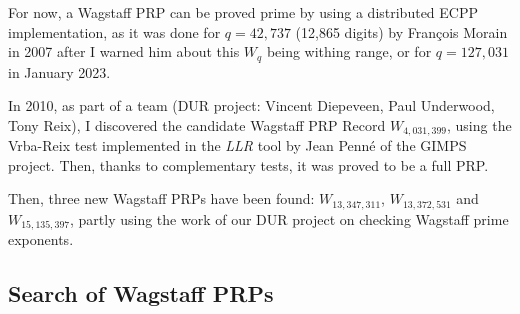 \documentclass[latin1]{quadrature}
\newif\ifenfrancais
\begin{document}
\begin{article}
\begin{article}
\vspace{.1in}

\ifenfrancais
Actuellement, il est possible de prouver qu'un nombre de Wagstaff est premier en utilisant la m\'ethode ECPP distribu\'ee sur plusieurs ordinateurs. Par exemple, c'est ainsi que le nombre de Wagstaff $W_{42,737}$ (12,865 digits) a \'et\'e prouv\'e premier par Fran\c{c}ois Morain en 2007, apr\`es que je lui ai signal\'e que ce $W_q$ \'etait \`a port\'ee des outils informatiques de l'\'epoque. Le plus r\'ecent nombre de Wagstaff premier connu est $W_{127,031}$, d\'ecouvert en janvier 2023.
\else
For now, a Wagstaff PRP can be proved prime by using a distributed ECPP implementation, as it was done for $q = 42,737$ (12,865 digits) by Fran\c{c}ois Morain in 2007 after I warned him about this $W_q$ being withing range,  or for $q=127,031$ in January 2023.
\fi

\vspace{.1in}


\ifenfrancais
En 2010, en tant que membre du projet DUR (Vincent Diepeveen, Paul Underwood, Tony Reix), j'ai d\'ecouvert le candidat record de PRP de Wagstaff :  $W_{4.031.399}$, en utilisant le test Vrba-Reix impl\'ement\'e dans l'outil \emph{LLR} par Jean Penn\'e du projet GIMPS.
Puis, au moyen de tests compl\'ementaires, il fut prouv\'e comme \'etant un vrai PRP.
\else
In 2010, as part of a team (DUR project: Vincent Diepeveen, Paul Underwood, Tony Reix), I discovered the candidate Wagstaff PRP Record $W_{4,031,399}$,
using the Vrba-Reix test implemented in the \emph{LLR} tool by Jean Penn\'e of the GIMPS project.
Then, thanks to complementary tests, it was proved to be a full PRP.
\fi

\vspace{.1in}

\ifenfrancais
Ensuite, 3 nouveaux PRPs de Wagstaff ont \'et\'e d\'ecouverts, en partie en utilisant les r\'esultats du projet DUR sur la v\'erification des candidats: $W_{13.347.311}$, $W_{13.372.531}$ et $W_{15.135.397}$.
\else
Then, three new Wagstaff PRPs have been found: $W_{13,347,311}$, $W_{13,372,531}$ and $W_{15,135,397}$, partly using the work of our DUR project on checking Wagstaff prime exponents.
\fi


\ifenfrancais
\subsection{ Comment trouver un Wagstaff PRP }
\else
\subsection{ Search of Wagstaff PRPs }
\fi


\end{article}
\end{article}
\end{document}
